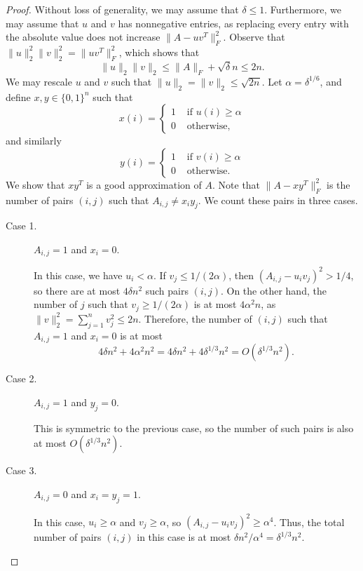 \documentclass[11pt]{article}
\theoremstyle{plain}
\theoremstyle{definition}
\begin{document}
\begin{proof}
 Without loss of generality, we may assume that $\delta\leq 1$. Furthermore, we may assume that $u$ and $v$ has nonnegative entries, as replacing every entry with the absolute value does not increase $\|A-uv^T\|_F^2$. Observe that $\|u\|_2^2\|v\|_2^2=\|uv^T\|_F^2$, which shows that $$\|u\|_2\|v\|_2\leq \|A\|_F+\sqrt{\delta}n\leq 2n.$$
We may rescale $u$ and $v$ such that $\|u\|_2=\|v\|_2\leq \sqrt{2n}$. Let $\alpha=\delta^{1/6}$, and define $x,y\in \{0,1\}^n$ such that 
 $$x(i)=\begin{cases} 
 1 &\mbox{ if } u(i)\geq \alpha \\
 0 &\mbox{ otherwise,}\end{cases}$$
 and similarly
  $$y(i)=\begin{cases} 
 1 &\mbox{ if } v(i)\geq \alpha \\
 0 &\mbox{ otherwise.}\end{cases}$$
 We show that $xy^T$ is a good approximation of $A$. Note that $\|A-xy^T\|_F^2$ is the number of pairs $(i,j)$ such that $A_{i,j}\neq x_iy_j$. We count these pairs in three cases.
 \begin{description}
     \item[Case 1.] $A_{i,j}=1$ and $x_i=0$.

     In this case, we have $u_i< \alpha$. If $v_j\leq 1/(2\alpha)$, then $(A_{i,j}-u_iv_j)^2>1/4$, so there are at most $4\delta n^2$ such pairs $(i,j)$. On the other hand, the number of $j$ such that $v_j\geq 1/(2\alpha)$ is at most $4\alpha^2 n$, as $\|v\|_2^2=\sum_{j=1}^nv_j^2\leq 2n$. Therefore, the number of $(i,j)$ such that $A_{i,j}=1$ and $x_i=0$ is at most $$4\delta n^2+4\alpha^2n^2=4\delta n^2+4\delta^{1/3}n^2=O(\delta^{1/3}n^2).$$

    \item[Case 2.] $A_{i,j}=1$ and $y_j=0$.
    
    This is symmetric to the previous case, so the number of such pairs is also at most $O(\delta^{1/3}n^2)$.
     
     \item[Case 3.] $A_{i,j}=0$ and $x_i=y_j=1$.

     In this case, $u_i\geq \alpha$ and $v_j\geq \alpha$, so $(A_{i,j}-u_iv_j)^2\geq \alpha^4$. Thus, the total number of pairs $(i,j)$ in this case is at most $\delta n^2/\alpha^4=\delta^{1/3}n^2$.\qedhere
 \end{description}
\end{proof}
\end{document}
